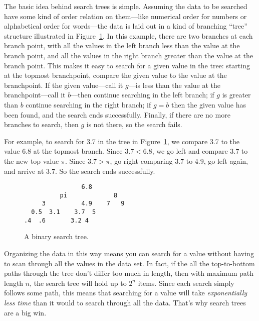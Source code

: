 \begin{definition}
The basic idea behind search trees is simple.  Assuming the data to be
searched have some kind of order relation on them---like numerical order
for numbers or alphabetical order for words---the data is laid out in
a kind of branching ``tree'' structure illustrated in
Figure~\ref{searchtree1}.  In this example, there are two branches at
each branch point, with all the values in the left branch less than
the value at the branch point, and all the values in the right branch
greater than the value at the branch point.  This makes it easy to
search for a given value in the tree: starting at the topmost
branchpoint, compare the given value to the value at the branchpoint.
If the given value---call it $g$---is less than the value at the
branchpoint---call it $b$---then continue searching in the left
branch; if $g$ is greater than $b$ continue searching in the right
branch; if $g = b$ then the given value has been found, and the search
ends successfully.  Finally, if there are no more branches to search,
then $g$ is not there, so the search fails.

For example, to search for 3.7 in the tree in Figure~\ref{searchtree1},
we compare 3.7 to the value 6.8 at the topmost branch.  Since $3.7 <
6.8$, we go left and compare $3.7$ to the new top value $\pi$.  Since
$3.7 > \pi$, go right comparing 3.7 to 4.9, go left again, and arrive
at 3.7. So the search ends successfully.

\begin{figure}

\begin{center}
\begin{verbatim}
                6.8
          pi             8  
     3          4.9    7   9 
  0.5  3.1    3.7  5
.4  .6       3.2 4 
\end{verbatim}
\end{center}

\caption{A binary search tree.}

\label{searchtree1}

\end{figure}

Organizing the data in this way means you can search for a value
without having to scan through all the values in the data set.  In
fact, if the all the top-to-bottom paths through the tree don't differ
too much in length, then with maximum path length $n$, the search tree
will hold up to $2^n$ items.  Since each search simply follows some
path, this means that searching for a value will take
\emph{exponentially less time} than it would to search through all the
data.  That's why search trees are a big win.


\end{definition}
